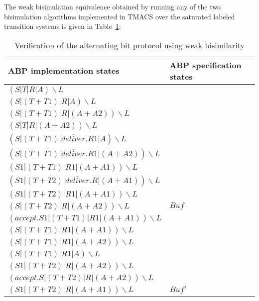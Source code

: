 The weak bisimulation equivalence obtained by running any of the two bisimulation algorithms implemented in TMACS over the saturated labeled transition systems is given in Table~\ref{table3}:

\begin{table}
\begin{tabular}{| p{7.5cm} | p{4.5cm} | }
	
  \hline                       
	ABP implementation states &
	ABP specification states
	\\ \hline
	
$\left(S|T|R|A\right)\backslash L$ & \\
$\left(S|\left(T+T1\right)|R|A\right)\backslash L$ & \\
$\left(S|\left(T+T1\right)|R|\left(A+A2\right)\right)\backslash L$ & \\
$\left(S|T|R|\left(A+A2\right)\right)\backslash L$ & \\
$\left(S|\left(T+T1\right)|\overline{deliver}.R1|A\right)\backslash L$ & \\
$\left(S|\left(T+T1\right)|\overline{deliver}.R1|\left(A+A2\right)\right)\backslash L$ & \\
$\left(S1|\left(T+T1\right)|R1|\left(A+A1\right)\right)\backslash L$ & \\
$\left(S1|\left(T+T2\right)|\overline{deliver}.R|\left(A+A1\right)\right)\backslash L$ & \\
$\left(S1|\left(T+T2\right)|R1|\left(A+A1\right)\right)\backslash L$ & \\
$\left(S|\left(T+T2\right)|R|\left(A+A2\right)\right)\backslash L$ &
  $\mathit{Buf}$   
  \\ \hline
   
$\left(accept.S1|\left(T+T1\right)|R1|\left(A+A1\right)\right)\backslash L$ & \\ 
$\left(S|\left(T+T1\right)|R1|\left(A+A1\right)\right)\backslash L$ & \\
$\left(S|\left(T+T1\right)|R1|\left(A+A2\right)\right)\backslash L$ & \\
$\left(S|\left(T+T1\right)|R1|A\right)\backslash L$ & \\
$\left(S1|\left(T+T2\right)|R|\left(A+A2\right)\right)\backslash L$ & \\
$\left(accept.S|\left(T+T2\right)|R|\left(A+A2\right)\right)\backslash L$ & \\
$\left(S1|\left(T+T2\right)|R|\left(A+A1\right)\right)\backslash L$ &
  $\mathit{Buf'}$
  \\ \hline  
\end{tabular}

\caption{Verification of the alternating bit protocol using weak bisimilarity}
\label{table3}
\end{table}

